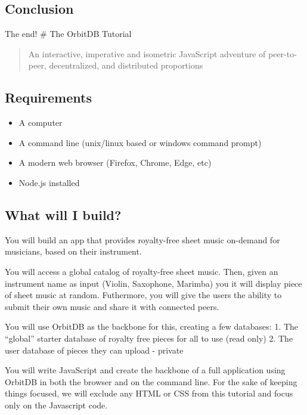 \subsection{Conclusion}\label{conclusion}

The end! \# The OrbitDB Tutorial

\begin{quote}
An interactive, imperative and isometric JavaScript adventure of
peer-to-peer, decentralized, and distributed proportions
\end{quote}

\subsection{Requirements}\label{requirements-1}

\begin{itemize}
\tightlist
\item
  A computer
\item
  A command line (unix/linux based or windows command prompt)
\item
  A modern web browser (Firefox, Chrome, Edge, etc)
\item
  Node.js installed
\end{itemize}

\subsection{What will I build?}\label{what-will-i-build-1}

You will build an app that provides royalty-free sheet music on-demand
for musicians, based on their instrument.

You will access a global catalog of royalty-free sheet music. Then,
given an instrument name as input (Violin, Saxophone, Marimba) you it
will display piece of sheet music at random. Futhermore, you will give
the users the ability to submit their own music and share it with
connected peers.

You will use OrbitDB as the backbone for this, creating a few databases:
1. The ``global'' starter database of royalty free pieces for all to use
(read only) 2. The user database of pieces they can upload - private

You will write JavaScript and create the backbone of a full application
using OrbitDB in both the browser and on the command line. For the sake
of keeping things focused, we will exclude any HTML or CSS from this
tutorial and focus only on the Javascript code.

